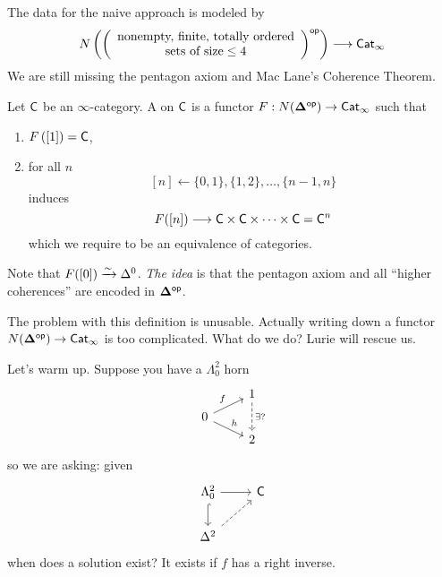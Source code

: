 The data for the naive approach is modeled by
\[
	N\left( \left( \begin{array}{c}
		\text{nonempty, finite, totally ordered} \\
		\text{sets of size} \le 4
\end{array}\right) \op \right) \to \cat{Cat}_{\infty}
\] 
We are still missing the pentagon axiom and Mac Lane's Coherence Theorem.

\begin{definition}
	Let $\mathsf{C}$ be an $\infty$-category. A  on $\mathsf{C}$ is a functor $F:N(\bb{\Delta}\op)\to \cat{Cat}_\infty$ such that
	\begin{enumerate}[1)]
		\item $F\left( [1] \right) = \mathsf{C}$,
		\item for all $n $
			\[
				[n] \leftarrow \{0,1\} , \{1,2\} , \dots, \{n-1, n\} 
			\] 
			induces
			\[
				F([n]) \to \C\times \C\times \dots\times \C = \C^{n}
			\] 
			which we require to be an equivalence of categories.
	\end{enumerate}
\end{definition}
Note that $F([0]) \xrightarrow{\sim} \Delta^{0}$. \emph{The idea} is that the pentagon axiom and all ``higher coherences'' are encoded in $\mathbf{\Delta}^\mathsf{op}$.

The problem with this definition is unusable. Actually writing down a functor $N(\bb{\Delta}\op)\to \cat{Cat}_\infty$ is too complicated. What do we do? Lurie will rescue us. 

Let's warm up. Suppose you have a $\Lambda^2_0$ horn
\[
\begin{tikzcd}[row sep=tiny]
	& 1 \ar[dd,dashed,"\exists ?"] \\
	0 \ar[ur,"f"] \ar[dr,"h"] \\
	& 2
\end{tikzcd}
\] 
so we are asking: given
\[
\begin{tikzcd}
	\Lambda_0^{2} \ar[r] \ar[d,hook] & \C \\
	\Delta^2 \ar[ur,dashed]
\end{tikzcd}
\] 
when does a solution exist? It exists if $f$ has a right inverse.

